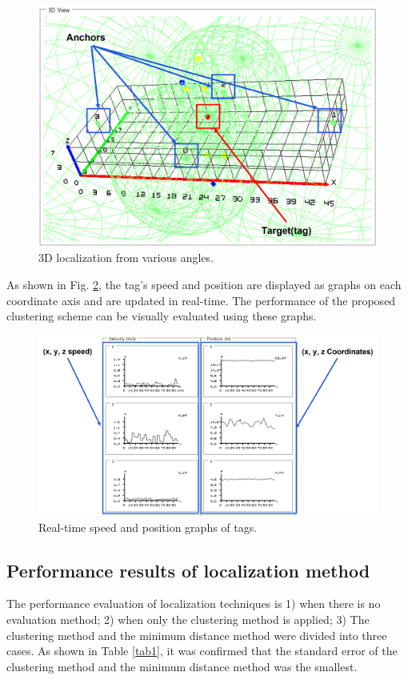 \documentclass[conference]{IEEEtran}
\begin{document}
\begin{figure}[htbp]
    \centerline{\includegraphics[width=0.62\columnwidth]{fig8.png}}
    \caption{3D localization from various angles.}
    \label{fig8}
\end{figure}

As shown in Fig. \ref{fig9}, the tag's speed and position are displayed as graphs on each coordinate axis and are updated in real-time. The performance of the proposed clustering scheme can be visually evaluated using these graphs.

\begin{figure}[htbp]
    \centerline{\includegraphics[width=0.62\columnwidth]{fig9.png}}
    \caption{Real-time speed and position graphs of tags.}
    \label{fig9}
\end{figure}

\subsection{Performance results of localization method}
The performance evaluation of localization techniques is 1) when there is no evaluation method; 2) when only the clustering method is applied; 3) The clustering method and the minimum distance method were divided into three cases. As shown in Table \ref{tab1}, it was confirmed that the standard error of the clustering method and the minimum distance method was the smallest.
\end{document}
